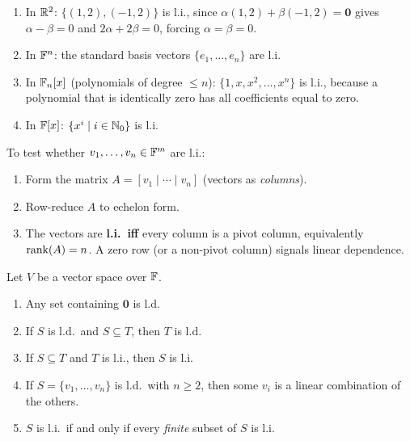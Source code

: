 \begin{exbox}
\begin{enumerate}
    \item In $\mathbb{R}^2$: $\{(1,2),(-1,2)\}$ is l.i., since
          $\alpha(1,2)+\beta(-1,2)=\mathbf{0}$ gives $\alpha-\beta=0$ and
          $2\alpha+2\beta=0$, forcing $\alpha=\beta=0$.

    \item In $\mathbb{F}^n$: the standard basis vectors $\{e_1,\ldots,e_n\}$ are l.i.

    \item In $\mathbb{F}_n[x]$ (polynomials of degree $\le n$): $\{1,x,x^2,\ldots,x^n\}$
          is l.i., because a polynomial that is identically zero has all
          coefficients equal to zero.

    \item In $\mathbb{F}[x]$: $\{x^i\mid i\in\mathbb{N}_0\}$ is l.i.
\end{enumerate}
\end{exbox}

\begin{methodbox}
\label{meth:li-row-reduction}
To test whether $v_1,\ldots,v_n\in\mathbb{F}^m$ are l.i.:
\begin{enumerate}
    \item Form the matrix $A=[v_1\mid\cdots\mid v_n]$ (vectors as \emph{columns}).
    \item Row-reduce $A$ to echelon form.
    \item The vectors are \textbf{l.i.\ iff} every column is a pivot column,
          equivalently $\operatorname{rank}(A)=n$.
          A zero row (or a non-pivot column) signals linear dependence.
\end{enumerate}
\end{methodbox}

\begin{propbox}
\label{prop:li-properties}
Let $V$ be a vector space over $\mathbb{F}$.
\begin{enumerate}[label=(\roman*)]
    \item Any set containing $\mathbf{0}$ is l.d.
    \item If $S$ is l.d.\ and $S\subseteq T$, then $T$ is l.d.
    \item If $S\subseteq T$ and $T$ is l.i., then $S$ is l.i.
    \item If $S=\{v_1,\ldots,v_n\}$ is l.d.\ with $n\ge 2$, then some $v_i$ is
          a linear combination of the others.
    \item $S$ is l.i.\ if and only if every \emph{finite} subset of $S$ is l.i.
\end{enumerate}
\end{propbox}

